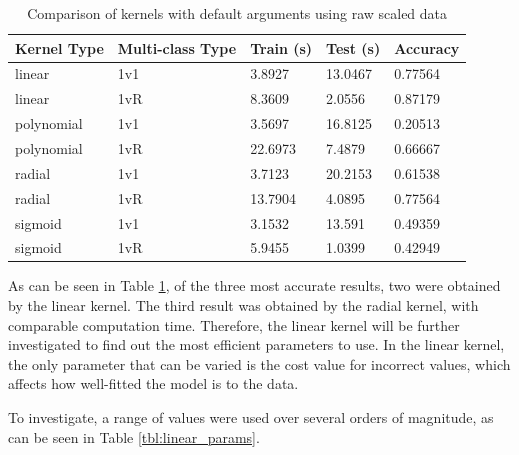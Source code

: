 \documentclass[a4paper, 10pt, conference]{ieeeconf}
\begin{document}
\begin{table}
\centering
\label{tbl:kernel_raw}
\caption{Comparison of kernels with default arguments using raw scaled data}
\begin{tabular}{lllll}
Kernel Type & Multi-class Type & Train (s) & Test (s) & Accuracy\\ \hline
linear & 1v1 & 3.8927 & 13.0467 & 0.77564\\ \hline
linear & 1vR & 8.3609 & 2.0556 & 0.87179\\ \hline
polynomial & 1v1 & 3.5697 & 16.8125 & 0.20513\\ \hline
polynomial & 1vR & 22.6973 & 7.4879 & 0.66667\\ \hline
radial & 1v1 & 3.7123 & 20.2153 & 0.61538\\ \hline
radial & 1vR & 13.7904 & 4.0895 & 0.77564\\ \hline
sigmoid & 1v1 & 3.1532 & 13.591 & 0.49359\\ \hline
sigmoid & 1vR & 5.9455 & 1.0399 & 0.42949\\ \hline
\end{tabular}
\end{table}

As can be seen in Table \ref{tbl:kernel_raw}, of the three most accurate results, two were obtained by the linear kernel. The third result was obtained by the radial kernel, with comparable computation time. Therefore, the linear kernel will be further investigated to find out the most efficient parameters to use. In the linear kernel, the only parameter that can be varied is the cost value for incorrect values, which affects how well-fitted the model is to the data.

To investigate, a range of values were used over several orders of magnitude, as can be seen in Table \ref{tbl:linear_params}.
\end{document}
